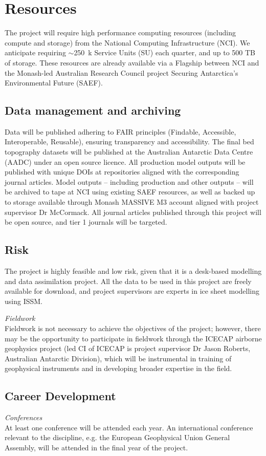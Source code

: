 \chapter{Resources}

The project will require high performance computing resources (including compute and storage) from the National Computing Infrastructure (NCI). We anticipate requiring $\sim$250~k Service Units (SU) each quarter, and up to 500 TB of storage. These resources are already available via a Flagship between NCI and the Monash-led Australian Research Council project Securing Antarctica’s Environmental Future (SAEF).

\section*{Data management and archiving}

Data will be published adhering to FAIR principles (Findable, Accessible, Interoperable, Reusable), ensuring transparency and accessibility. The final bed topography datasets will be published at the Australian Antarctic Data Centre (AADC) under an open source licence. All production model outputs will be published with unique DOIs at repositories aligned with the corresponding journal articles. Model outputs – including production and other outputs – will be archived to tape at NCI using existing SAEF resources, as well as backed up to storage available through Monash MASSIVE M3 account aligned with project supervisor Dr McCormack. All journal articles published through this project will be open source, and tier 1 journals will be targeted.

\section*{Risk}

The project is highly feasible and low risk, given that it is a desk-based modelling and data assimilation project. All the data to be used in this project are freely available for download, and project supervisors are experts in ice sheet modelling using ISSM.

\textit{Fieldwork}\\
Fieldwork is not necessary to achieve the objectives of the project; however, there may be the opportunity to participate in fieldwork through the ICECAP airborne geophysics project (led CI of ICECAP is project supervisor Dr Jason Roberts, Australian Antarctic Division), which will be instrumental in training of geophysical instruments and in developing broader expertise in the field. \\

\section*{Career Development}

\textit{Conferences}\\
At least one conference will be attended each year. An international conference relevant to the discipline, e.g. the European Geophysical Union General Assembly, will be attended in the final year of the project.